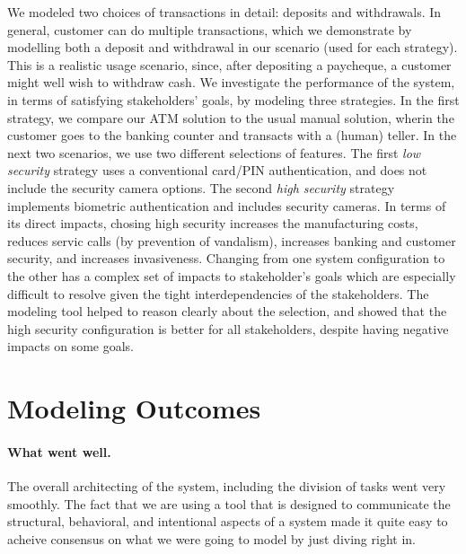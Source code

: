 \documentclass[10pt,fleqn]{article}
\begin{document}
We modeled two choices of transactions in
detail: deposits and withdrawals.  In general, customer can do multiple 
transactions, which we demonstrate by modelling both a deposit and withdrawal
in our scenario (used for each strategy).  This is a realistic usage scenario,
since, after depositing a paycheque, a customer might well wish to withdraw
cash.  We investigate the performance of the system, in terms of satisfying
stakeholders' goals, by modeling three strategies.  In the first strategy,
we compare our ATM solution to the usual manual solution, wherin the customer
goes to the banking counter and transacts with a (human) teller.  In the 
next two scenarios, we use two different selections of features.  The first
\textit{low security} strategy uses a conventional card/PIN authentication,
and does not include the security camera options.  The second 
\textit{high security} strategy implements biometric authentication and 
includes security cameras.  In terms of its direct impacts, chosing high 
security increases the manufacturing costs, reduces servic calls (by 
prevention of vandalism), increases banking and customer security, and 
increases invasiveness.  Changing from one system configuration to the other
has a complex set of impacts to stakeholder's goals which are especially 
difficult to resolve given the tight interdependencies of the stakeholders.
The modeling tool helped to reason clearly about the selection, and showed that
the high security configuration is better for all stakeholders, despite
having negative impacts on some goals.

\section{Modeling Outcomes}
\paragraph{What went well.}
	The overall architecting of the system, including the division of tasks
	went very smoothly.  The fact that we are using a tool that is
	designed to communicate the structural, behavioral, and intentional 
	aspects of a system made it quite easy to acheive consensus on what we
	were going to model by just diving right in.
\end{document}
